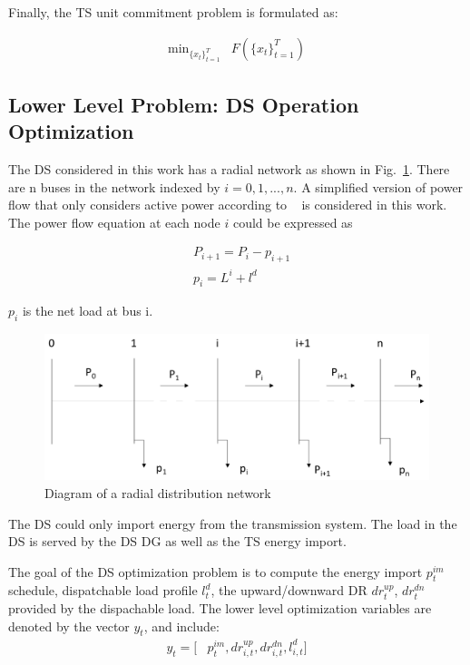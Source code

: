 Finally, the TS unit commitment problem is formulated as: 

\begin{align}
\text{min}_{\{x_t\}^{T}_{t=1}} & F\left(\{x_t\}^{T}_{t=1}\right)\nonumber
\end{align}

\subsection{Lower Level Problem: DS Operation Optimization}
The DS considered in this work has a radial network as shown in Fig.~\ref{pf}. There are n buses in the network indexed by $i = 0,1,..., n.$ A simplified version of power flow that only considers active power according to ~\cite{dpf} is considered in this work. The power flow equation at each node $i$ could be expressed as

\begin{align}
& P_{i+1} = P_i - p_{i+1}\nonumber \\
& p_{i} =  L^i_{} + l^d_{} \nonumber 
\end{align}

$p_{i}$ is the net load at bus i. 

\begin{figure}
\centering
\includegraphics[scale=0.2]{pfs.png}
\caption{Diagram of a radial distribution network}
\label{pf}
\end{figure}

The DS could only import energy from the transmission system. The load in the DS is served by the DS DG as well as the TS energy import.

The goal of the DS optimization problem is to compute the energy import $p^{im}_{t}$ schedule, dispatchable load profile $l^d_{t}$, the upward/downward DR $dr_{t}^{up}$, $dr_{t}^{dn}$ provided by the dispachable load. The lower level optimization variables are denoted by the vector $y_t$, and include:
\begin{align*}
y_t=[&p^{im}_{t}, dr_{i,t}^{up},dr_{i,t}^{dn},l^d_{i,t}]
\end{align*} 

